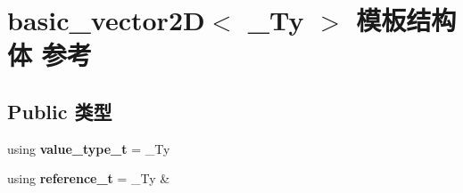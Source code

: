 \hypertarget{structbasic__vector2_d}{}\section{basic\+\_\+vector2D$<$ \+\_\+\+Ty $>$ 模板结构体 参考}
\label{structbasic__vector2_d}
\subsection*{Public 类型}
\begin{DoxyCompactItemize}
\item 
\mbox{\label{structbasic__vector2_d_a3a8e15c6a773a34b04090604c981e63e}} 
using {\bfseries value\+\_\+type\+\_\+t} = \+\_\+\+Ty
\item 
\mbox{\label{structbasic__vector2_d_afa9c650d6178f708c88f7abab001c4a3}} 
using {\bfseries reference\+\_\+t} = \+\_\+\+Ty \&
\end{DoxyCompactItemize}
